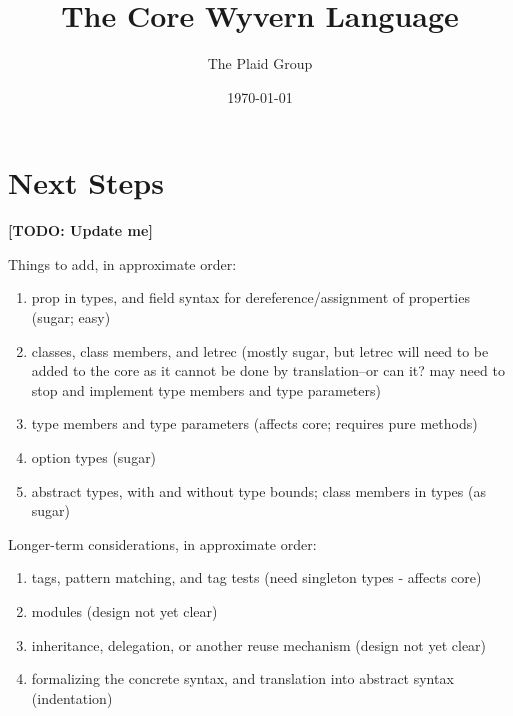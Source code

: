 \documentclass[11pt]{article}
\title{The Core Wyvern Language}
\author{The Plaid Group}
\date{\today}
\newcommand{\TODO}[1]{\textbf{[TODO: #1]}}
\begin{document}
\maketitle



\clearpage

\section{Next Steps}

\TODO{Update me}

Things to add, in approximate order:

\begin{enumerate}

\item prop in types, and field syntax for dereference/assignment of properties (sugar; easy)

\item classes, class members, and letrec (mostly sugar, but letrec will need to be added to the core as it cannot be done by translation--or can it?  may need to stop and implement type members and type parameters)

\item type members and type parameters (affects core; requires pure methods)

\item option types (sugar)

\item abstract types, with and without type bounds; class members in types (as sugar)

\end{enumerate}


Longer-term considerations, in approximate order:

\begin{enumerate}

\item tags, pattern matching, and tag tests (need singleton types - affects core)

\item modules (design not yet clear)

\item inheritance, delegation, or another reuse mechanism (design not yet clear)

\item formalizing the concrete syntax, and translation into abstract syntax (indentation)

\end{enumerate}
\end{document}
